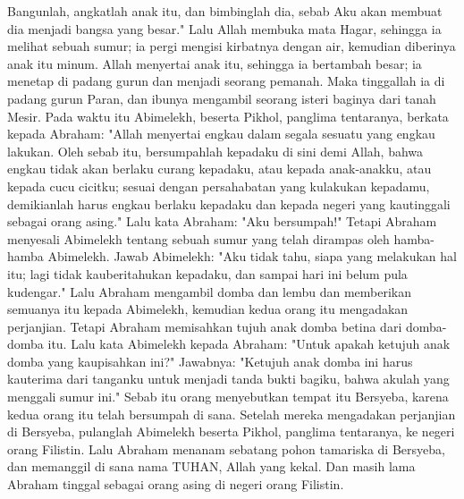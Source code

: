 \begin{biblechapter}
\verse Bangunlah, angkatlah anak itu, dan bimbinglah dia, sebab Aku akan membuat dia menjadi bangsa yang besar."
\verse Lalu Allah membuka mata Hagar, sehingga ia melihat sebuah sumur; ia pergi mengisi kirbatnya dengan air, kemudian diberinya anak itu minum.
\verse Allah menyertai anak itu, sehingga ia bertambah besar; ia menetap di padang gurun dan menjadi seorang pemanah.
\verse Maka tinggallah ia di padang gurun Paran, dan ibunya mengambil seorang isteri baginya dari tanah Mesir.
 Pada waktu itu Abimelekh, beserta Pikhol, panglima tentaranya, berkata kepada Abraham: "Allah menyertai engkau dalam segala sesuatu yang engkau lakukan.
\verse Oleh sebab itu, bersumpahlah kepadaku di sini demi Allah, bahwa engkau tidak akan berlaku curang kepadaku, atau kepada anak-anakku, atau kepada cucu cicitku; sesuai dengan persahabatan yang kulakukan kepadamu, demikianlah harus engkau berlaku kepadaku dan kepada negeri yang kautinggali sebagai orang asing."
\verse Lalu kata Abraham: "Aku bersumpah!"
\verse Tetapi Abraham menyesali Abimelekh tentang sebuah sumur yang telah dirampas oleh hamba-hamba Abimelekh.
\verse Jawab Abimelekh: "Aku tidak tahu, siapa yang melakukan hal itu; lagi tidak kauberitahukan kepadaku, dan sampai hari ini belum pula kudengar."
\verse Lalu Abraham mengambil domba dan lembu dan memberikan semuanya itu kepada Abimelekh, kemudian kedua orang itu mengadakan perjanjian.
\verse Tetapi Abraham memisahkan tujuh anak domba betina dari domba-domba itu.
\verse Lalu kata Abimelekh kepada Abraham: "Untuk apakah ketujuh anak domba yang kaupisahkan ini?"
\verse Jawabnya: "Ketujuh anak domba ini harus kauterima dari tanganku untuk menjadi tanda bukti bagiku, bahwa akulah yang menggali sumur ini."
\verse Sebab itu orang menyebutkan tempat itu Bersyeba, karena kedua orang itu telah bersumpah di sana.
\verse Setelah mereka mengadakan perjanjian di Bersyeba, pulanglah Abimelekh beserta Pikhol, panglima tentaranya, ke negeri orang Filistin.
\verse Lalu Abraham menanam sebatang pohon tamariska di Bersyeba, dan memanggil di sana nama TUHAN, Allah yang kekal.
\verse Dan masih lama Abraham tinggal sebagai orang asing di negeri orang Filistin.
\end{biblechapter}

